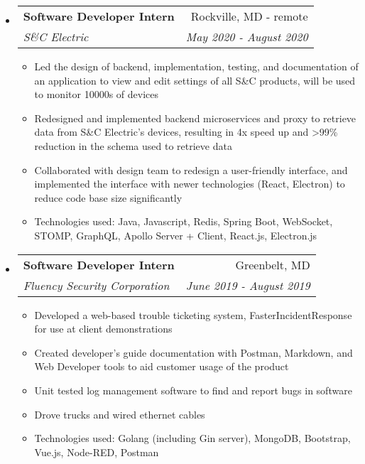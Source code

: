 \documentclass[letterpaper,10pt]{article}
\makeatletter
\newcommand{\resitem}[1]{\item #1 \vspace{-3.5pt}}
\newcommand{\ressubheading}[4]{
\begin{tabular*}{7.0in}{l@{\extracolsep{\fill}}r}
		\textbf{#1} & #2 \\
		\textit{#3} & \textit{#4} \\
\end{tabular*}\vspace{-6pt}}
\makeatother
\begin{document}
\begin{itemize}
\item
    \ressubheading{Software Developer Intern}{Rockville, MD - remote}{S\&C Electric}{May 2020 - August 2020}
    \begin{itemize}
        \resitem{Led the design of backend, implementation, testing, and documentation of an application to view and edit settings of all S\&C products, will be used to monitor 10000s of devices}
        \resitem{Redesigned and implemented backend microservices and proxy to retrieve data from S\&C Electric's devices, resulting in 4x speed up and >99\% reduction in the schema used to retrieve data}
        \resitem{Collaborated with design team to redesign a user-friendly interface, and implemented the interface with newer technologies (React, Electron) to reduce code base size significantly}
        \resitem{Technologies used: Java, Javascript, Redis, Spring Boot, WebSocket, STOMP, GraphQL, Apollo Server + Client, React.js, Electron.js}
    \end{itemize}
\item
    \ressubheading{Software Developer Intern}{Greenbelt, MD}{Fluency Security Corporation}{June 2019 - August 2019}
	\begin{itemize}
	    \resitem{Developed a web-based trouble ticketing system, FasterIncidentResponse for use at client demonstrations}
		\resitem{Created developer's guide documentation with Postman, Markdown, and Web Developer tools to aid customer usage of the product}
		\resitem{Unit tested log management software to find and report bugs in software}
		\resitem{Drove trucks and wired ethernet cables}
		\resitem{Technologies used: Golang (including Gin server), MongoDB, Bootstrap, Vue.js, Node-RED, Postman}
	\end{itemize}
\end{itemize}
\end{document}
